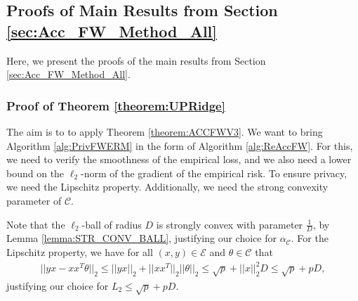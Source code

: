 \documentclass{article}
\begin{document}

\subsection{Proofs of Main Results from Section \ref{sec:Acc_FW_Method_All}}\label{sec:Proofs of the Main Results_ACC_FW}

Here, we present the proofs of the main results from Section \ref{sec:Acc_FW_Method_All}.


\subsubsection{Proof of Theorem \ref{theorem:UPRidge}}
\label{AppThmUPR}

The aim is to to apply Theorem \ref{theorem:ACCFWV3}. We want to bring Algorithm \ref{alg:PrivFWERM} in the form of Algorithm \ref{alg:ReAccFW}. For this, we need to verify the smoothness of the empirical loss, and we also need a lower bound on the $\ell_2$-norm of the gradient of the empirical risk. To ensure privacy, we need the Lipschitz property. Additionally, we need the strong convexity parameter of $\mathcal{C}$.

Note that the $\ell_2$-ball of radius $D$ is strongly convex with parameter $\frac{1}{D}$, by Lemma \ref{lemma:STR_CONV_BALL}, justifying our choice for $\alpha_{\mathcal{C}}$. For the Lipschitz property, we have for all $(x, y) \in \mathcal{E}$ and $\theta \in \mathcal{C}$ that
\begin{align*}
||yx - xx^T\theta||_2 \leq ||yx||_2 + ||xx^T||_2||\theta||_2 \leq \sqrt{p} + ||x||_2^2D\leq \sqrt{p} + pD,
\end{align*}
justifying our choice for $L_2 \leq \sqrt{p} + pD$.
\end{document}
